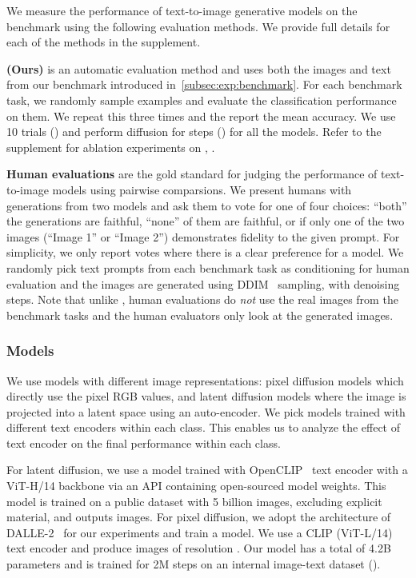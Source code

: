 We measure the performance of text-to-image generative models on the benchmark using the following evaluation methods.
We provide full details for each of the methods in the supplement.

\par \noindent \textbf{\OURS (Ours)} is an automatic evaluation method and uses both the images and text from our benchmark introduced in~\cref{subsec:exp:benchmark}.
For each benchmark task, we randomly sample  examples and evaluate the classification performance on them. We repeat this three times and the report the mean accuracy.
We use 10 trials (\ie) and perform diffusion for  steps (\ie) for all the models. Refer to the supplement for ablation experiments on , .

\par \noindent \textbf{Human evaluations} are the gold standard for judging the performance of text-to-image models using pairwise comparsions.
We present humans with generations from two models and ask them to vote for one of four choices: ``both'' the generations are faithful, ``none'' of them are faithful, or if only one of the two images (``Image 1'' or ``Image 2'') demonstrates fidelity to the given prompt.
For simplicity, we only report votes where there is a clear preference for a model.
We randomly pick  text prompts from each benchmark task as conditioning for human evaluation and the images are generated using DDIM~\cite{song2021denoising} sampling, with  denoising steps.
Note that unlike \OURS, human evaluations do \emph{not} use the real images from the benchmark tasks and the human evaluators only look at the generated images.

\subsubsection{Models}\label{subsubsec:exp:benchmark:models}
We use models with different image representations: pixel diffusion models which directly use the pixel RGB values, and latent diffusion models where the image is projected into a latent space using an auto-encoder.
We pick models trained with different text encoders within each class.
This enables us to analyze the effect of text encoder on the final performance within each class.

\par {} For latent diffusion, we use a model trained with OpenCLIP~\cite{ilharco_gabriel_2021_5143773} text encoder with a ViT-H/14 backbone via an API containing open-sourced model weights. 
This model is trained on a public dataset with 5 billion images, excluding explicit material, and outputs  images.
For pixel diffusion, we adopt the architecture of DALLE-2~\cite{ramesh2022hierarchical} for our experiments and train a model.
We use a CLIP (ViT-L/14) text encoder and produce images of resolution .
Our model has a total of 4.2B parameters and is trained for 2M steps on an internal image-text dataset (\DATASET).

